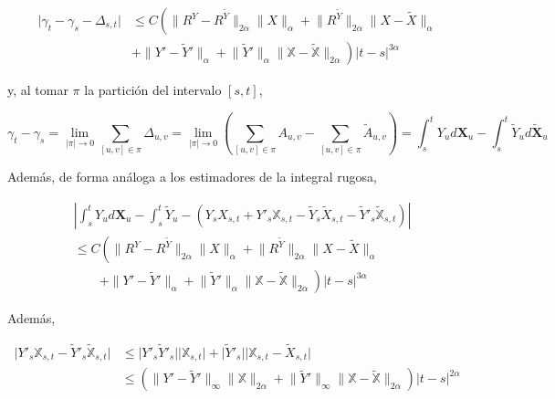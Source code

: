 \begin{align*}
	\lvert \gamma_t - \gamma_s - \Delta_{s,t} \rvert &\leq C \left( \lVert R^Y - R^{ \tilde{Y} } \rVert_{2 \alpha} \lVert X \rVert_{\alpha} + \lVert R^{ \tilde{Y} } \rVert_{2 \alpha} \lVert X - \tilde{X} \rVert_{\alpha}  \right. \\
	&\left. + \lVert Y' - \tilde{Y}' \rVert_{\alpha} + \lVert \tilde{Y}' \rVert_{\alpha} \lVert \mathbb{X} - \tilde{ \mathbb{X}}  \rVert_{2 \alpha} \right) \lvert t - s \rvert^{3 \alpha}
\end{align*}

y, al tomar $\pi$ la partición del intervalo $[s,t]$,

\[
	\gamma_t - \gamma_s = \lim_{ \lvert \pi \rvert \rightarrow 0 } \sum_{ [u,v] \in \pi } \Delta_{u,v} = \lim_{ \lvert \pi \rvert  \rightarrow 0 } \left( \sum_{ [u,v] \in \pi } A_{u,v} - \sum_{ [u,v] \in \pi } \tilde{A}_{u,v} \right) = \int_s^t Y_u d \mathbf{X}_u - \int_s^t \tilde{Y}_u d \tilde{ \mathbf{X} }_u
\]

Además, de forma análoga a los estimadores de la integral rugosa, 

\begin{align*}
	&\left\lvert \int_s^t Y_u d \mathbf{X}_u - \int_s^t \tilde{Y}_u - ( Y_s X_{s,t} + Y'_s \mathbb{X}_{s,t} - \tilde{Y}_s \tilde{X}_{s,t} - \tilde{Y}'_s \tilde{ \mathbb{X} }_{s,t}  ) \right \rvert \\
	&\leq C \left( \lVert R^Y - R^{ \tilde{Y} } \rVert_{2 \alpha} \lVert X \rVert_{\alpha} + \lVert R^{ \tilde{Y} } \rVert_{2 \alpha} \lVert X - \tilde{X} \rVert_{\alpha} \right. \\
	&\qquad \left. + \lVert Y' - \tilde{Y}' \rVert_{\alpha} + \lVert \tilde{Y}' \rVert_{\alpha} \lVert \mathbb{X} - \tilde{ \mathbb{X}}  \rVert_{2 \alpha} \right) \lvert t - s \rvert^{3 \alpha}
\end{align*}

Además,

\begin{align*}
	\lvert Y'_s \mathbb{X}_{s,t} - \tilde{Y}'_s \tilde{ \mathbb{X} }_{s,t} \rvert &\leq \lvert Y'_s \tilde{Y}'_s \rvert \lvert \mathbb{X}_{s,t} \rvert + \lvert \tilde{Y}'_s \rvert \lvert \mathbb{X}_{s,t} - \tilde{X}_{s,t} \rvert \\ 
	&\leq \left( \lVert Y' - \tilde{Y}'  \rVert_{\infty} \lVert \mathbb{X} \rVert_{2\alpha} + \lVert \tilde{Y}' \rVert_{\infty} \lVert \mathbb{X} - \tilde{ \mathbb{X} } \rVert_{2 \alpha} \right) \lvert t - s \rvert^{2 \alpha}
\end{align*}

